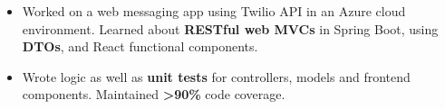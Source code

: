 \documentclass[9pt]{developercv} %
\begin{document}
\begin{minipage}[t]{\textwidth}
	\begin{itemize}[noitemsep,topsep=0pt]
		\item Worked on a web messaging app using Twilio API in an Azure cloud environment.
		Learned about \textbf{RESTful web MVCs} in Spring Boot, using \textbf{DTOs},
		and React functional components. 
		\item Wrote logic as well as \textbf{unit tests} for controllers, models and frontend components. Maintained \textbf{>90\%} code coverage.
	\end{itemize}
\end{minipage}

\end{document}
